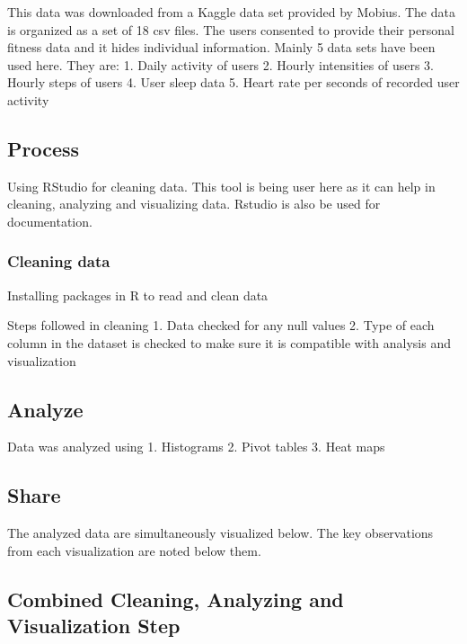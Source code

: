 \documentclass[
]{article}
\begin{document}
This data was downloaded from a Kaggle data set provided by Mobius. The
data is organized as a set of 18 csv files. The users consented to
provide their personal fitness data and it hides individual information.
Mainly 5 data sets have been used here. They are: 1. Daily activity of
users 2. Hourly intensities of users 3. Hourly steps of users 4. User
sleep data 5. Heart rate per seconds of recorded user activity

\hypertarget{process}{%
\subsection{Process}\label{process}}

Using RStudio for cleaning data. This tool is being user here as it can
help in cleaning, analyzing and visualizing data. Rstudio is also be
used for documentation.

\hypertarget{cleaning-data}{%
\subsubsection{Cleaning data}\label{cleaning-data}}

Installing packages in R to read and clean data

Steps followed in cleaning 1. Data checked for any null values 2. Type
of each column in the dataset is checked to make sure it is compatible
with analysis and visualization

\hypertarget{analyze}{%
\subsection{Analyze}\label{analyze}}

Data was analyzed using 1. Histograms 2. Pivot tables 3. Heat maps

\hypertarget{share}{%
\subsection{Share}\label{share}}

The analyzed data are simultaneously visualized below. The key
observations from each visualization are noted below them.

\hypertarget{combined-cleaning-analyzing-and-visualization-step}{%
\subsection{Combined Cleaning, Analyzing and Visualization
Step}\label{combined-cleaning-analyzing-and-visualization-step}}
\end{document}
